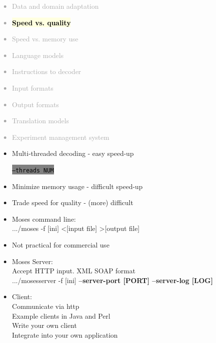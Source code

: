 \documentclass[landscape]{uedslides2C}
\newcommand{\currenttopic}[1]{\colorbox{lightyellow}{\textcolor{black}{\bf #1}}}
\newcommand{\littlecode}[1]{\colorbox{gray}{\textcolor{black}{\small \tt #1}}}
\begin{document}

\vspace{-5mm}
\textcolor{darkgrey}{
\begin{itemize} \itemsep -1mm
\item Data and domain adaptation
\item \currenttopic{Speed vs. quality}
\item Speed vs. memory use
\item Language models
\item Instructions to decoder
\item Input formats
\item Output formats
\item Translation models
\item Experiment management system
\end{itemize}
}



\vspace{15mm}
\begin{itemize}
\item Multi-threaded decoding - easy speed-up
\begin{center}
\littlecode{--threads NUM}
\end{center}

\item Minimize memory usage - difficult speed-up

\item Trade speed for quality - (more) difficult

\end{itemize}



\begin{itemize}

\item Moses command line:
     \\ .../moses -f {[}ini{]} \textless {[}input file{]} \textgreater {[}output file{]}
\item Not practical for commercial use

\item Moses Server:
    \\ Accept HTTP input. XML SOAP format
    \\ .../mosesserver -f {[}ini{]} {\bf --server-port {[}PORT{]} --server-log {[}LOG{]} }

\item Client:
    \\ Communicate via http
    \\ Example clients in Java and Perl
    \\ Write your own client
	\\ Integrate into your own application
    
\end{itemize}
\end{document}
